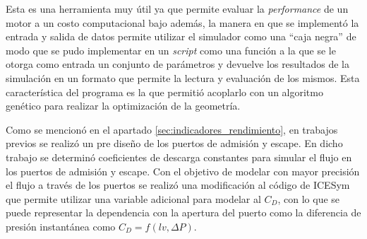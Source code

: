 Esta es una herramienta muy útil ya que permite evaluar la \emph{performance}
de un motor a un costo computacional bajo además, la manera en que se
implementó la entrada y salida de datos permite utilizar el simulador como una
``caja negra'' de modo que se pudo implementar en un \emph{script} como una
función a la que se le otorga como entrada un conjunto de parámetros y devuelve
los resultados de la simulación en un formato que permite la lectura y
evaluación de los mismos.
%
Esta característica del programa es la que permitió acoplarlo con un algoritmo
genético para realizar la optimización de la geometría.


Como se mencionó en el apartado \ref{sec:indicadores_rendimiento}, en trabajos
previos se realizó un pre diseño de los puertos de admisión y escape.
%
En dicho trabajo se determinó coeficientes de descarga constantes
para simular el flujo en los puertos de admisión y escape.
%
Con el objetivo de modelar con mayor precisión el flujo a través de los puertos
se realizó una modificación al código de ICESym que permite utilizar una
variable adicional para modelar al $C_D$, con lo que se puede representar la
dependencia con la apertura del puerto como la diferencia de presión
instantánea como $C_D = f(lv, \Delta P)$.
